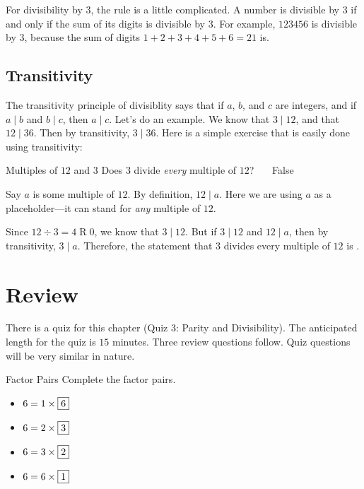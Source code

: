 \documentclass[a4paper,10pt]{report}
\begin{document}
For divisibility by \(3\), the rule is a little complicated. A number is
divisible by \(3\) if and only if the sum of its digits is divisible by \(3\).
For example, \(123456\) is divisible by \(3\), because the sum of digits
\(1+2+3+4+5+6=21\) is.

\subsection{Transitivity}

The \gls{transitivity} principle of divisiblity says that if \(a\), \(b\), and
\(c\) are integers, and if \(a \mid b\) and \(b \mid c\), then \(a \mid c\).
Let's do an example. We know that \(3 \mid 12\), and that \(12 \mid 36\). Then
by transitivity, \(3 \mid 36\). Here is a simple exercise that is easily done
using transitivity:

\begin{problem}{Multiples of \(12\) and \(3\)}
 Does \(3\) divide \emph{every} multiple of \(12\)? \hfill {}~~~False

 \begin{solution}
  Say \(a\) is some multiple of \(12\). By definition, \(12 \mid a\). Here we
  are using \(a\) as a placeholder---it can stand for \emph{any} multiple of
  \(12\).

  Since \(12 \div 3 = 4 \operatorname{R} 0\), we know that \(3 \mid 12\). But
  if \(3 \mid 12\) and \(12 \mid a\), then by transitivity, \(3 \mid a\).
  Therefore, the statement that \(3\) divides every multiple of \(12\) is
  .
 \end{solution}
\end{problem}

\section{Review}

There is a quiz for this chapter (Quiz 3: Parity and Divisibility). The
anticipated length for the quiz is \(15\) minutes. Three review questions
follow. Quiz questions will be very similar in nature.

\begin{problem}{Factor Pairs}
 Complete the factor pairs.

 \begin{itemize}
  \item \(6 = 1 \times \Ans{6}\)
  \item \(6 = 2 \times \Ans{3}\)
  \item \(6 = 3 \times \Ans{2}\)
  \item \(6 = 6 \times \Ans{1}\)
 \end{itemize}
\end{problem}
\end{document}
